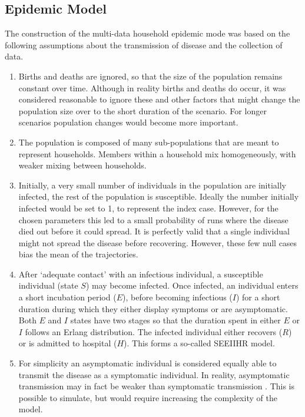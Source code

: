

\subsection{Epidemic Model}

The construction of the multi-data household epidemic mode was based on the following assumptions about the transmission of disease and the collection of data.
\begin{enumerate}[{A}.1]
	\item Births and deaths are ignored, so that the size of the population remains constant over time. Although in reality births and deaths do occur, it was considered reasonable to ignore these and other factors that might change the population size over to the short duration of the scenario. For longer scenarios population changes would become more important.
	\item The population is composed of many sub-populations that are meant to represent households. Members within a household mix homogeneously, with weaker mixing between households.
	\item Initially, a very small number of individuals in the population are initially infected, the rest of the population is susceptible. Ideally the number initially infected would be set to 1, to represent the index case. However, for the chosen parameters this led to a small probability of runs where the disease died out before it could spread. It is perfectly valid that a single individual might not spread the disease before recovering. However, these few null cases bias the mean of the trajectories.
	\item After `adequate contact' with an infectious individual, a susceptible individual (state $S$) may become infected. Once infected, an individual enters a short incubation period ($E$), before becoming infectious ($I$) for a short duration during which they either display symptoms or are asymptomatic. Both $E$ and $I$ states have two stages so that the duration spent in either $E$ or $I$ follows an Erlang distribution. The infected individual either recovers ($R$) or is admitted to hospital ($H$). This forms a so-called SEEIIHR model.
	\item For simplicity an asymptomatic individual is considered equally able to transmit the disease as a symptomatic individual. In reality, asymptomatic transmission may in fact be weaker than symptomatic transmission \cite{Patrozou Mermel 2009}. This is possible to simulate, but would require increasing the complexity of the model.

\end{enumerate}
